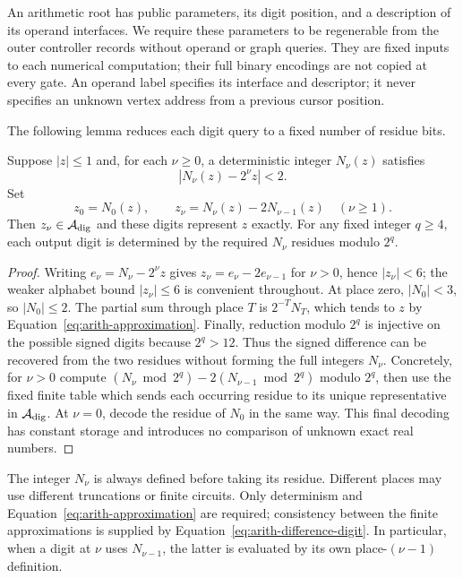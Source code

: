 An arithmetic root has public parameters, its digit position, and a description
of its operand interfaces.  We require these parameters to be
regenerable from the outer controller records without operand or graph
queries.  They are fixed inputs to each numerical computation; their
full binary encodings are not copied at every gate.  An operand label
specifies its interface and descriptor; it never specifies an unknown
vertex address from a previous cursor position.

The following lemma reduces each digit query to a fixed number of
residue bits.

\begin{lemma}
\label{lem:arith-residue-stream}
Suppose $|z|\leq1$ and, for each $\nu\geq0$, a deterministic integer
$N_\nu(z)$ satisfies
\begin{equation}
 |N_\nu(z)-2^\nu z|<2.
 \label{eq:arith-approximation}
\end{equation}
Set
\begin{equation}
 z_0=N_0(z),\qquad z_\nu=N_\nu(z)-2N_{\nu-1}(z)\quad(\nu\geq1).
 \label{eq:arith-difference-digit}
\end{equation}
Then $z_\nu\in\mathcal A_{\rm dig}$ and these digits represent $z$ exactly.
For any fixed integer $q\geq4$, each output digit is determined by
the required $N_\nu$ residues modulo $2^q$.
\end{lemma}

\begin{proof}
Writing $e_\nu=N_\nu-2^\nu z$ gives
$z_\nu=e_\nu-2e_{\nu-1}$ for $\nu>0$, hence $|z_\nu|<6$; the weaker alphabet
bound $|z_\nu|\leq6$ is convenient throughout.  At place zero,
$|N_0|<3$, so $|N_0|\leq2$.  The partial sum through place $T$ is
$2^{-T}N_T$, which tends to $z$ by Equation~\eqref{eq:arith-approximation}.
Finally, reduction modulo $2^q$ is injective on the possible signed
digits because $2^q>12$.  Thus the signed difference can be recovered
from the two residues without forming the full integers $N_\nu$.
Concretely, for $\nu>0$ compute
$(N_\nu\bmod 2^q)-2(N_{\nu-1}\bmod 2^q)$ modulo $2^q$, then use the
fixed finite table which sends each occurring residue to its unique
representative in $\mathcal A_{\rm dig}$.  At $\nu=0$, decode the residue of
$N_0$ in the same way.  This final decoding has constant storage and
introduces no comparison of unknown exact real numbers.
\end{proof}

The integer $N_\nu$ is always defined before taking its residue.
Different places may use different truncations or finite circuits.
Only determinism and Equation~\eqref{eq:arith-approximation} are
required; consistency between the finite approximations is supplied
by Equation~\eqref{eq:arith-difference-digit}.  In particular, when a
digit at $\nu$ uses $N_{\nu-1}$, the latter is evaluated by its own
place-$(\nu-1)$ definition.

